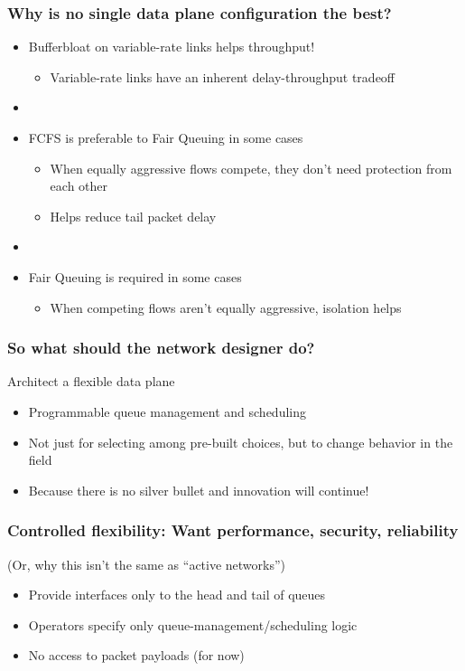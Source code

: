 \begin{frame}[plain]
\frametitle{Why is no single data plane configuration the best?}
\begin{itemize}
\item Bufferbloat on variable-rate links helps throughput!
      \begin{itemize}
      \item Variable-rate links have an inherent delay-throughput tradeoff
      \end{itemize} 

\item[] 

\item FCFS is preferable to Fair Queuing in some cases
      \begin{itemize}
      \item When equally aggressive flows compete, they don't need
        protection from each other
        \item Helps reduce tail packet delay
      \end{itemize}

\item[]

\item Fair Queuing is required in some cases
      \begin{itemize}      
      \item When competing flows aren't equally aggressive,
        isolation helps
      \end{itemize}
\end{itemize}
\end{frame}

\begin{frame}[plain]
\frametitle{So what should the network designer do?}
Architect a flexible data plane
\begin{itemize}
\item Programmable queue management and scheduling
\item Not just for selecting among pre-built choices, but to change
  behavior in the field
\item Because there is no silver bullet and innovation will continue!
\end{itemize}
\end{frame}

\begin{frame}[plain]
\frametitle{Controlled flexibility: Want performance, security,
  reliability}

(Or, why this isn't the same as ``active networks'')

\begin{itemize}
\item Provide interfaces only to the head and tail of queues
\item Operators specify only queue-management/scheduling logic
\item No access to packet payloads (for now)
\end{itemize}
\end{frame}

